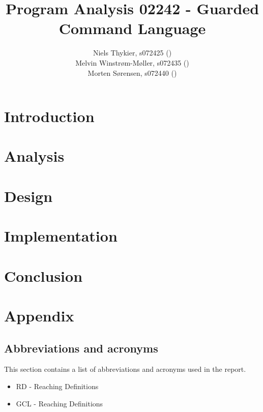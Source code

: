 \documentclass{report}
\title{Program Analysis 02242 - Guarded Command Language}
\author{Niels Thykier, s072425 (\email{s072425@student.dtu.dk})
\\Melvin Winstrøm-Møller, s072435 (\email{s072435@student.dtu.dk})
\\Morten Sørensen, s072440 (\email{s072440@student.dtu.dk})}
\begin{document}
\parindent 0pt
\parskip 3mm
\setlength{\parindent}{0.5cm}
\newcommand{\docpar}[0]{\vspace{0.5cm} \noindent}
\newcommand{\footref}[1]{\footnotemark[\ref{#1}]}
\newcommand{\newconcept}[1]{\textit{#1}}
\newcommand{\command}[1]{\textbf{#1}}

\maketitle
{}
{}
\tableofcontents
\newpage
{}
{}
\listoffigures
\newpage

\chapter{Introduction}



\chapter{Analysis}



\chapter{Design}









\chapter{Implementation}

\chapter{Conclusion}



\chapter{Appendix}

\section{Abbreviations and acronyms}

This section contains a list of abbreviations and acronyms used in
the report.

\begin{itemize}
\item RD - Reaching Definitions
\item GCL - Reaching Definitions
\end{itemize}
\end{document}
